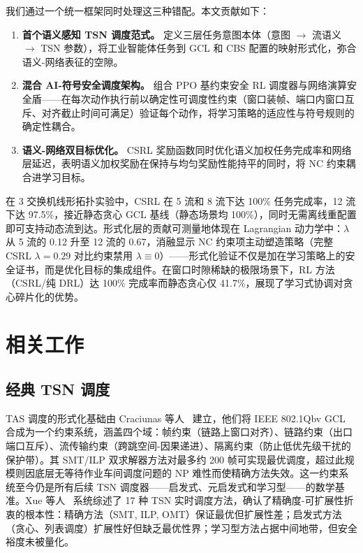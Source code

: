 \documentclass[UTF8]{ctexart}
\begin{document}
我们通过一个统一框架同时处理这三种错配。本文贡献如下：

\begin{enumerate}
\item \textbf{首个语义感知 TSN 调度范式。} 定义三层任务意图本体（意图 $\rightarrow$ 流语义 $\rightarrow$ TSN 参数），将工业智能体任务到 GCL 和 CBS 配置的映射形式化，弥合语义-网络表征的空隙。
\item \textbf{混合 AI-符号安全调度架构。} 组合 PPO 基约束安全 RL 调度器与网络演算安全盾——在每次动作执行前以确定性可调度性约束（窗口装帧、端口内窗口互斥、对齐截止时间可满足）验证每个动作，将学习策略的适应性与符号规则的确定性耦合。
\item \textbf{语义-网络双目标优化。} CSRL 奖励函数同时优化语义加权任务完成率和网络层延迟，表明语义加权奖励在保持与均匀奖励性能持平的同时，将 NC 约束耦合进学习目标。
\end{enumerate}

在 3 交换机线形拓扑实验中，CSRL 在 5 流和 8 流下达 100\% 任务完成率，12 流下达 97.5\%，接近静态贪心 GCL 基线（静态场景均 100\%），同时无需离线重配置即可支持动态流到达。形式化层的贡献可测量地体现在 Lagrangian 动力学中：$\lambda$ 从 5 流的 0.12 升至 12 流的 0.67，消融显示 NC 约束项主动塑造策略（完整 CSRL $\lambda=0.29$ 对比约束禁用 $\lambda\equiv0$）——形式化验证不仅是加在学习策略上的安全证书，而是优化目标的集成组件。在窗口时隙稀缺的极限场景下，RL 方法（CSRL/纯 DRL）达 100\% 完成率而静态贪心仅 41.7\%，展现了学习式协调对贪心碎片化的优势。

\section{相关工作}

\subsection{经典 TSN 调度}

TAS 调度的形式化基础由 Craciunas 等人~\cite{craciunas2016smt} 建立，他们将 IEEE 802.1Qbv GCL 合成为一个约束系统，涵盖四个域：帧约束（链路上窗口对齐）、链路约束（出口端口互斥）、流传输约束（跨跳空间-因果递进）、隔离约束（防止低优先级干扰的保护带）。其 SMT/ILP 双求解器方法对最多约 200 帧可实现最优调度，超过此规模则因底层无等待作业车间调度问题的 NP 难性而使精确方法失效。这一约束系统至今仍是所有后续 TSN 调度器——启发式、元启发式和学习型——的数学基准。Xue 等人~\cite{xue2024survey} 系统综述了 17 种 TSN 实时调度方法，确认了精确度-可扩展性折衷的根本性：精确方法（SMT, ILP, OMT）保证最优但扩展性差；启发式方法（贪心、列表调度）扩展性好但缺乏最优性界；学习型方法占据中间地带，但安全裕度未被量化。
\end{document}
